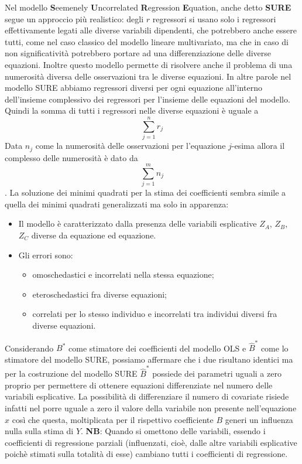 \documentclass[a4page, 11pt]{article} %
\begin{document}
Nel modello \textbf{S}eemenely \textbf{U}ncorrelated \textbf{R}egression \textbf{E}quation, anche detto \textbf{SURE} segue un approccio più realistico: degli $r$ regressori si usano solo i regressori effettivamente legati alle diverse variabili dipendenti, che potrebbero anche essere tutti, come nel caso classico del modello lineare multivariato, ma che in caso di non significatività potrebbero portare ad una differenziazione delle diverse equazioni. Inoltre questo modello permette di risolvere anche il problema di una numerosità diversa delle osservazioni tra le diverse equazioni.
\newline
In altre parole nel modello SURE abbiamo regressori diversi per ogni equazione all’interno dell’insieme complessivo dei regressori per l’insieme delle equazioni del modello. 
\newline
Quindi la somma di tutti i regressori nelle diverse equazioni è uguale a
\begin{equation*}
\sum_{j=1}^n r_j
\end{equation*}
\newline
Data $n_j$ come la numerosità delle osservazioni per l’equazione $j$-esima allora il complesso delle numerosità è dato da 
\begin{equation*}
\sum_{j=1}^m n_j
\end{equation*}.
\newline
La soluzione dei minimi quadrati per la stima dei coefficienti sembra simile a quella dei minimi quadrati generalizzati ma solo in apparenza: 
\begin{itemize}
\item Il modello è caratterizzato dalla presenza delle variabili esplicative $Z_A$, $Z_B$, $Z_C$ diverse da equazione ed equazione.
\item Gli errori sono:
	\begin{itemize}[noitemsep]
	\item omoschedastici e incorrelati nella stessa equazione;
	\item eteroschedastici fra diverse equazioni;
	\item correlati per lo stesso individuo e incorrelati tra individui diversi fra diverse equazioni.
	\end{itemize}
\end{itemize}
Considerando $B^*$ come stimatore dei coefficienti del modello OLS e $\hat{B}^*$ come lo stimatore del modello SURE, possiamo affermare che i due risultano identici ma per la costruzione del modello SURE $\hat{B}^*$ possiede dei parametri uguali a zero proprio per permettere di ottenere equazioni differenziate nel numero delle variabili esplicative. La possibilità di differenziare il numero di covariate risiede infatti nel porre uguale a zero il valore della variabile non presente nell'equazione $x$ così che questa, moltiplicata per il rispettivo coefficiente $B$ generi un influenza nulla sulla stima di $Y$. \newline
\textbf{NB}: Quando si omettono delle variabili, essendo i coefficienti di regressione parziali (influenzati, cioè, dalle altre variabili esplicative poichè stimati sulla totalità di esse) cambiano tutti i coefficienti di regressione.
\end{document}
